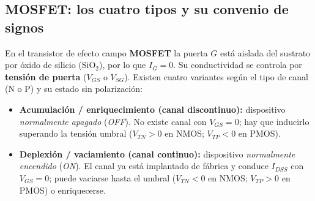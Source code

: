 \documentclass[11pt,a4paper]{article}
\begin{document}
	\subsection{MOSFET: los cuatro tipos y su convenio de signos}

	En el transistor de efecto campo \textbf{MOSFET} la puerta $G$ está aislada del sustrato por óxido de silicio ($\mathrm{SiO}_2$), por lo que $I_G = 0$. Su conductividad se controla por \textbf{tensión de puerta} ($V_{GS}$ o $V_{SG}$). Existen cuatro variantes según el tipo de canal (N o P) y su estado sin polarización:

	\begin{itemize}
		\item \textbf{Acumulación / enriquecimiento (canal discontinuo):} dispositivo \emph{normalmente apagado} (\emph{OFF}). No existe canal con $V_{GS} = 0$; hay que inducirlo superando la tensión umbral ($V_{TN} > 0$ en NMOS; $V_{TP} < 0$ en PMOS).
		\item \textbf{Deplexión / vaciamiento (canal continuo):} dispositivo \emph{normalmente encendido} (\emph{ON}). El canal ya está implantado de fábrica y conduce $I_{DSS}$ con $V_{GS} = 0$; puede vaciarse hasta el umbral ($V_{TN} < 0$ en NMOS; $V_{TP} > 0$ en PMOS) o enriquecerse.
	\end{itemize}
\end{document}
